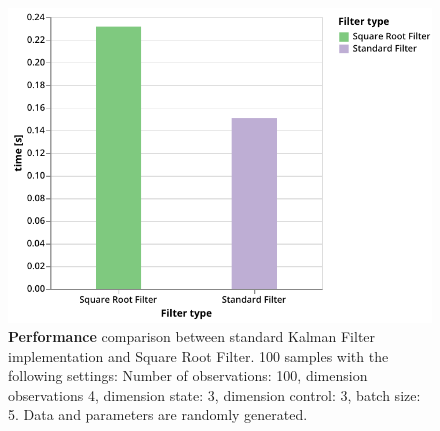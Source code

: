 \documentclass{article}
\begin{document}
\begin{figure}
\includegraphics[width=\textwidth]{perf_sr}
 \caption{\textbf{Performance} comparison between standard Kalman Filter implementation and Square Root Filter. 100 samples with the following settings: Number of observations: 100, dimension observations 4, dimension state: 3, dimension control: 3, batch size: 5. Data and parameters are randomly generated.}
 \label{fig:num_stab_perf}
\end{figure}
\end{document}
